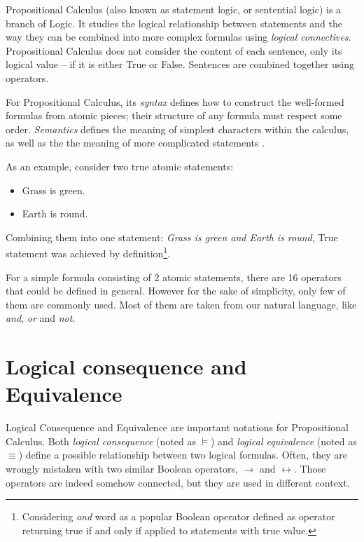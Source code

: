 \documentclass[12pt,english,pdflatex]{aghdpl}
\begin{document}
Propositional Calculus (also known as statement logic, or sentential logic) is a branch of Logic.
It studies the logical relationship between statements and the way they can be combined into more complex formulas using \textit{logical connectives}. Propositional Calculus does not consider the content of each sentence, only its logical value -- if it is either True or False. Sentences are combined together using operators.

For Propositional Calculus, its \textit{syntax} defines  how to construct  the well-formed formulas from atomic pieces; their structure of any formula must respect some order. \textit{Semantics} defines the meaning of simplest characters within the calculus, as well as the the meaning of more complicated statements \cite{ben-ari:2001}.

As an example, consider two true atomic statements:
\begin{itemize}
\item Grass is green.
\item Earth is round.
\end{itemize}
Combining them into one statement: \textit{Grass is green and Earth is round}, True statement was achieved by definition\footnote{Considering \textit{and} word as a popular Boolean operator defined as operator returning true if and only if applied to statements with true value.}.

For a simple formula consisting of 2 atomic statements, there are 16 operators that could be defined in general. However for the sake of simplicity, only few of them are commonly used. Most of them are taken from our natural language, like \textit{and}, \textit{or} and \textit{not}. 


\section{Logical consequence and Equivalence}
\label{sec:implication}

Logical Consequence and Equivalence are important notations for Propositional Calculus. Both \textit{logical consequence} (noted as $\models$) and \textit{logical equivalence} (noted as $\equiv$) define a possible relationship between two logical formulas. Often, they are wrongly mistaken with two similar Boolean operators, $\rightarrow$ and $\leftrightarrow$. Those operators are indeed somehow connected, but they are used in different context.
\end{document}
